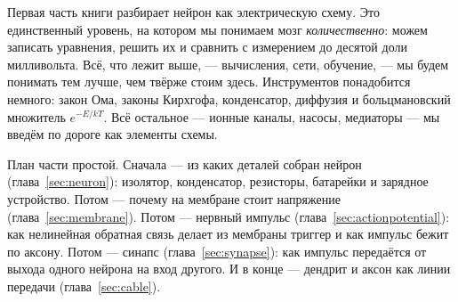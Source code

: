 \noindent Первая часть книги разбирает нейрон как электрическую схему. Это единственный уровень, на котором мы понимаем мозг \emph{количественно}: можем записать уравнения, решить их и сравнить с измерением до десятой доли милливольта. Всё, что лежит выше, --- вычисления, сети, обучение, --- мы будем понимать тем лучше, чем твёрже стоим здесь. Инструментов понадобится немного: закон Ома, законы Кирхгофа, конденсатор, диффузия и больцмановский множитель $e^{-E/kT}$. Всё остальное --- ионные каналы, насосы, медиаторы --- мы введём по дороге как элементы схемы.

План части простой. Сначала --- из каких деталей собран нейрон (глава~\ref{sec:neuron}): изолятор, конденсатор, резисторы, батарейки и зарядное устройство. Потом --- почему на мембране стоит напряжение (глава~\ref{sec:membrane}). Потом --- нервный импульс (глава~\ref{sec:actionpotential}): как нелинейная обратная связь делает из мембраны триггер и как импульс бежит по аксону. Потом --- синапс (глава~\ref{sec:synapse}): как импульс передаётся от выхода одного нейрона на вход другого. И в конце --- дендрит и аксон как линии передачи (глава~\ref{sec:cable}).
